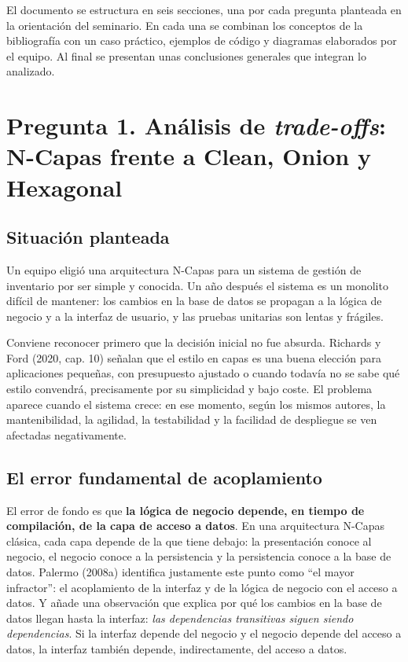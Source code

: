 \documentclass[11pt,a4paper]{article}
\begin{document}
El documento se estructura en seis secciones, una por cada pregunta planteada en la orientación del seminario. En cada una se combinan los conceptos de la bibliografía con un caso práctico, ejemplos de código y diagramas elaborados por el equipo. Al final se presentan unas conclusiones generales que integran lo analizado.

\section{Pregunta 1. Análisis de \emph{trade-offs}: N-Capas frente a Clean, Onion y Hexagonal}

\subsection{Situación planteada}

Un equipo eligió una arquitectura N-Capas para un sistema de gestión de inventario por ser simple y conocida. Un año después el sistema es un monolito difícil de mantener: los cambios en la base de datos se propagan a la lógica de negocio y a la interfaz de usuario, y las pruebas unitarias son lentas y frágiles.

Conviene reconocer primero que la decisión inicial no fue absurda. Richards y Ford (2020, cap. 10) señalan que el estilo en capas es una buena elección para aplicaciones pequeñas, con presupuesto ajustado o cuando todavía no se sabe qué estilo convendrá, precisamente por su simplicidad y bajo coste. El problema aparece cuando el sistema crece: en ese momento, según los mismos autores, la mantenibilidad, la agilidad, la testabilidad y la facilidad de despliegue se ven afectadas negativamente.

\subsection{El error fundamental de acoplamiento}

El error de fondo es que \textbf{la lógica de negocio depende, en tiempo de compilación, de la capa de acceso a datos}. En una arquitectura N-Capas clásica, cada capa depende de la que tiene debajo: la presentación conoce al negocio, el negocio conoce a la persistencia y la persistencia conoce a la base de datos. Palermo (2008a) identifica justamente este punto como ``el mayor infractor'': el acoplamiento de la interfaz y de la lógica de negocio con el acceso a datos. Y añade una observación que explica por qué los cambios en la base de datos llegan hasta la interfaz: \emph{las dependencias transitivas siguen siendo dependencias}. Si la interfaz depende del negocio y el negocio depende del acceso a datos, la interfaz también depende, indirectamente, del acceso a datos.
\end{document}
